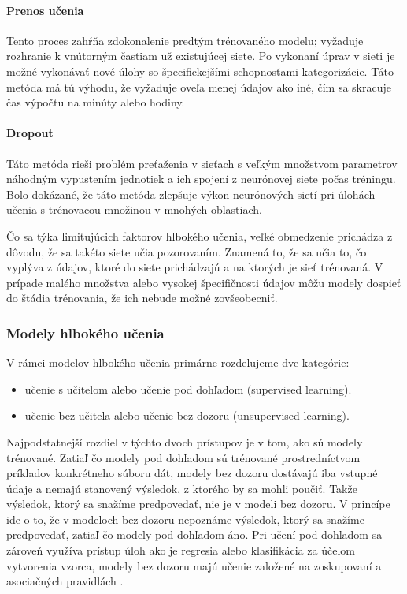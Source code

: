 \paragraph{Prenos učenia} Tento proces zahŕňa zdokonalenie predtým trénovaného modelu; vyžaduje rozhranie k vnútorným častiam už existujúcej siete. Po vykonaní úprav v sieti je možné vykonávať nové úlohy so špecifickejšími schopnosťami kategorizácie. Táto metóda má tú výhodu, že vyžaduje oveľa menej údajov ako iné, čím sa skracuje čas výpočtu na minúty alebo hodiny.
\paragraph{Dropout} Táto metóda rieši problém preťaženia v sieťach s veľkým množstvom parametrov náhodným vypustením jednotiek a ich spojení z neurónovej siete počas tréningu. Bolo dokázané, že táto metóda zlepšuje výkon neurónových sietí pri úlohách učenia s trénovacou množinou v mnohých oblastiach. 

Čo sa týka limitujúcich faktorov hlbokého učenia, veľké obmedzenie prichádza z dôvodu, že sa takéto siete učia pozorovaním. Znamená to, že sa učia to, čo vyplýva z údajov, ktoré do siete prichádzajú a na ktorých je sieť trénovaná. V prípade malého množstva alebo vysokej špecifičnosti údajov môžu modely dospieť do štádia trénovania, že ich nebude možné zovšeobecniť.


\subsubsection{Modely hlbokého učenia}
V rámci modelov hlbokého učenia primárne rozdelujeme dve kategórie:
\begin{itemize}
  \item učenie s učitelom alebo učenie pod dohľadom (supervised learning).
  \item učenie bez učitela alebo učenie bez dozoru (unsupervised learning).
\end{itemize}



Najpodstatnejší rozdiel v týchto dvoch prístupov je v tom, ako sú modely trénované. Zatiaľ čo modely pod dohľadom sú trénované prostredníctvom príkladov konkrétneho súboru dát, modely bez dozoru dostávajú iba vstupné údaje a nemajú stanovený výsledok, z ktorého by sa mohli poučiť. Takže výsledok, ktorý sa snažíme predpovedať, nie je v modeli bez dozoru. V princípe ide o to, že v modeloch bez dozoru nepoznáme výsledok, ktorý sa snažíme predpovedať, zatiaľ čo modely pod dohľadom áno. Pri učení pod dohľadom sa zároveň využíva prístup úloh ako je regresia alebo klasifikácia za účelom vytvorenia vzorca, modely bez dozoru majú učenie založené na zoskupovaní a asociačných pravidlách \cite{deep_learning1}.

